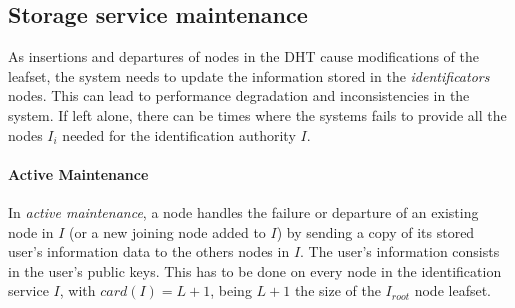 
\subsection{Storage service maintenance}
\label{sec:lazy_node_maintenance}


As insertions and departures of nodes in the DHT cause modifications of the
leafset, the system needs to update the information stored in the
\textit{identificators} nodes. This can lead to performance degradation and inconsistencies in the
system. If left alone, there can be times where the systems
fails to provide all the nodes $I_i$ needed for the identification authority
$I$.



\paragraph{Active Maintenance}
  In \textit{active maintenance}, a
node handles the failure or departure of an existing node in $I$ (or a new
joining node added to $I$) by sending a copy of its stored user's
information data to the others nodes in $I$.
The user's information consists in the user's public keys. This has to be done on every node in the identification service
$I$, with $card(I) = L+1$, being $L+1$ the size of the $I_{root}$ node leafset.

